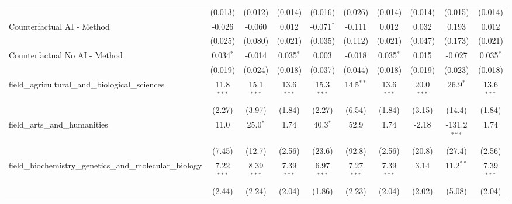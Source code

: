 \begin{tabular}{lccccccccc}
                                                               & (0.013)       & (0.012)       & (0.014)       & (0.016)       & (0.026)        & (0.014)       & (0.014)       & (0.015)        & (0.014)\\   
   Counterfactual AI - Method                                  & -0.026        & -0.060        & 0.012         & -0.071$^{*}$  & -0.111         & 0.012         & 0.032         & 0.193          & 0.012\\   
                                                               & (0.025)       & (0.080)       & (0.021)       & (0.035)       & (0.112)        & (0.021)       & (0.047)       & (0.173)        & (0.021)\\   
   Counterfactual No AI - Method                               & 0.034$^{*}$   & -0.014        & 0.035$^{*}$   & 0.003         & -0.018         & 0.035$^{*}$   & 0.015         & -0.027         & 0.035$^{*}$\\   
                                                               & (0.019)       & (0.024)       & (0.018)       & (0.037)       & (0.044)        & (0.018)       & (0.019)       & (0.023)        & (0.018)\\   
   field\_agricultural\_and\_biological\_sciences              & 11.8$^{***}$  & 15.1$^{***}$  & 13.6$^{***}$  & 15.3$^{***}$  & 14.5$^{**}$    & 13.6$^{***}$  & 20.0$^{***}$  & 26.9$^{*}$     & 13.6$^{***}$\\   
                                                               & (2.27)        & (3.97)        & (1.84)        & (2.27)        & (6.54)         & (1.84)        & (3.15)        & (14.4)         & (1.84)\\   
   field\_arts\_and\_humanities                                & 11.0          & 25.0$^{*}$    & 1.74          & 40.3$^{*}$    & 52.9           & 1.74          & -2.18         & -131.2$^{***}$ & 1.74\\   
                                                               & (7.45)        & (12.7)        & (2.56)        & (23.6)        & (92.8)         & (2.56)        & (20.8)        & (27.4)         & (2.56)\\   
   field\_biochemistry\_genetics\_and\_molecular\_biology      & 7.22$^{***}$  & 8.39$^{***}$  & 7.39$^{***}$  & 6.97$^{***}$  & 7.27$^{***}$   & 7.39$^{***}$  & 3.14          & 11.2$^{**}$    & 7.39$^{***}$\\   
                                                               & (2.44)        & (2.24)        & (2.04)        & (1.86)        & (2.23)         & (2.04)        & (2.02)        & (5.08)         & (2.04)\\   

\end{tabular}
